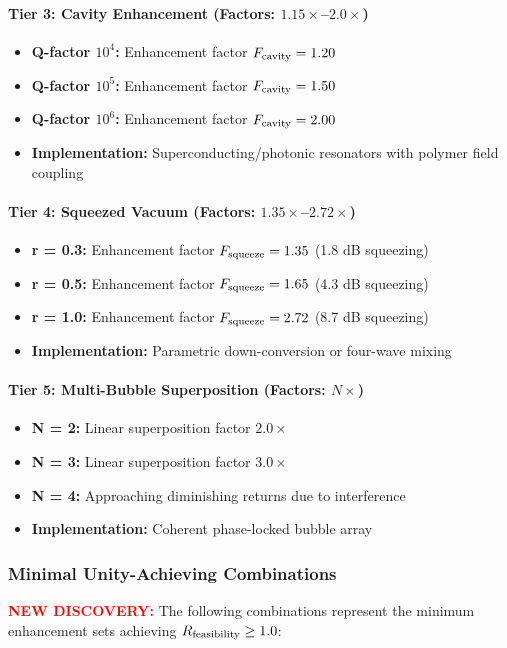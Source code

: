 \documentclass[11pt]{article}
\begin{document}
\paragraph{Tier 3: Cavity Enhancement (Factors: $1.15\times$--$2.0\times$)}
\begin{itemize}
  \item \textbf{Q-factor $10^4$:} Enhancement factor $F_{\rm cavity} = 1.20$
  \item \textbf{Q-factor $10^5$:} Enhancement factor $F_{\rm cavity} = 1.50$  
  \item \textbf{Q-factor $10^6$:} Enhancement factor $F_{\rm cavity} = 2.00$
  \item \textbf{Implementation:} Superconducting/photonic resonators with polymer field coupling
\end{itemize}

\paragraph{Tier 4: Squeezed Vacuum (Factors: $1.35\times$--$2.72\times$)}
\begin{itemize}
  \item \textbf{r = 0.3:} Enhancement factor $F_{\rm squeeze} = 1.35$ (1.8 dB squeezing)
  \item \textbf{r = 0.5:} Enhancement factor $F_{\rm squeeze} = 1.65$ (4.3 dB squeezing)
  \item \textbf{r = 1.0:} Enhancement factor $F_{\rm squeeze} = 2.72$ (8.7 dB squeezing)
  \item \textbf{Implementation:} Parametric down-conversion or four-wave mixing
\end{itemize}

\paragraph{Tier 5: Multi-Bubble Superposition (Factors: $N\times$)}
\begin{itemize}
  \item \textbf{N = 2:} Linear superposition factor $2.0\times$
  \item \textbf{N = 3:} Linear superposition factor $3.0\times$
  \item \textbf{N = 4:} Approaching diminishing returns due to interference
  \item \textbf{Implementation:} Coherent phase-locked bubble array
\end{itemize}

\subsubsection*{Minimal Unity-Achieving Combinations}
\textcolor{red}{\textbf{NEW DISCOVERY:}} The following combinations represent the minimum enhancement sets achieving $R_{\rm feasibility} \geq 1.0$:
\end{document}
